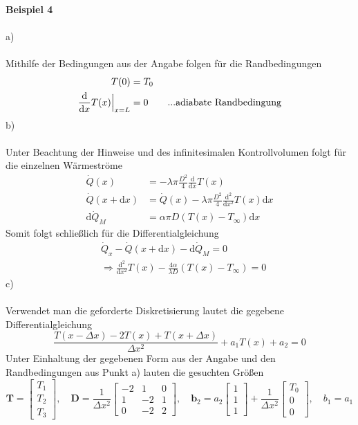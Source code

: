 \textbf{Beispiel 4}\\ \\
a)\\ \\
Mithilfe der Bedingungen aus der Angabe folgen für die Randbedingungen
\begin{align*}
	T(0) &= T_0 \\
	\frac{\text{d}}{\text{d}x}T(x)\Bigl|_{x = L} &= 0 \qquad ...\text{adiabate Randbedingung}
\end{align*}
b)\\ \\
Unter Beachtung der Hinweise und des infinitesimalen Kontrollvolumen folgt für die einzelnen Wärmeströme
\begin{align*}
	\dot{Q}(x) &= -\lambda\pi\frac{D^2}{4}\frac{\text{d}}{\text{d}x}T(x) \\
	\dot{Q}(x + \text{d}x) &= 	\dot{Q}(x) - \lambda\pi\frac{D^2}{4}\frac{\text{d}^2}{\text{d}x^2}T(x)\text{d}x \\
	\text{d}\dot{Q}_M &= \alpha\pi D(T(x) - T_\infty)\text{d}x
\end{align*}
Somit folgt schließlich für die Differentialgleichung
\begin{align*}
	& \dot{Q}_x - \dot{Q}(x + \text{d}x) - \text{d}\dot{Q}_M = 0 \\
	& \Rightarrow \frac{\text{d}^2}{\text{d}x^2}T(x) - \frac{4\alpha}{\lambda D}\left(T(x) - T_\infty\right) = 0
\end{align*}
c)\\ \\
Verwendet man die geforderte Diskretisierung lautet die gegebene Differentialgleichung
\[
	\frac{T(x - \Delta x) - 2T(x) + T(x + \Delta x)}{\Delta x^2} + a_1T(x) + a_2 = 0
\]
Unter Einhaltung der gegebenen Form aus der Angabe und den Randbedingungen aus Punkt a) lauten die gesuchten Größen \\
\[
	\textbf{T} = \begin{bmatrix}
		T_1 \\
		T_2 \\
		T_3 
	\end{bmatrix}
	, \quad 
	\textbf{D} = \frac{1}{\Delta x^2}\begin{bmatrix}
		-2 & 1 & 0 \\
		1 & -2 & 1 \\
		0 & -2 & 2
	\end{bmatrix}
	, \quad 
	\textbf{b}_2 = a_2\begin{bmatrix}
		1 \\
		1 \\
		1
	\end{bmatrix}
	+ \frac{1}{\Delta x^2}
	\begin{bmatrix}
		T_0 \\
		0 \\
		0
	\end{bmatrix}
	, \quad 
	b_1 = a_1
\]